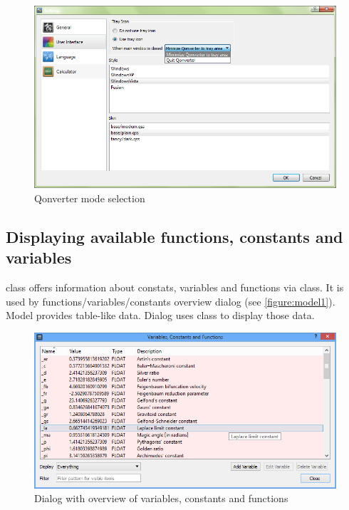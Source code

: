 \begin{figure}[ht]
\begin{center}
\includegraphics[width=13cm]{graphics/real-world/02-settings-gui.png}
\caption{Qonverter mode selection}\label{figure:settingsgui}
\end{center}
\end{figure}

\subsection{Displaying available functions, constants and variables}\label{chap:guii}
 class offers information about constats, variables and functions via class. It is used by functions/variables/constants overview dialog (see \autoref{figure:model1}). Model provides table-like data. Dialog uses class to display those data.

\begin{figure}[ht]
\centering
\includegraphics[width=13cm]{graphics/real-world/07-model1.png}
\caption{Dialog with overview of variables, constants and functions}\label{figure:model1}
\end{figure}


